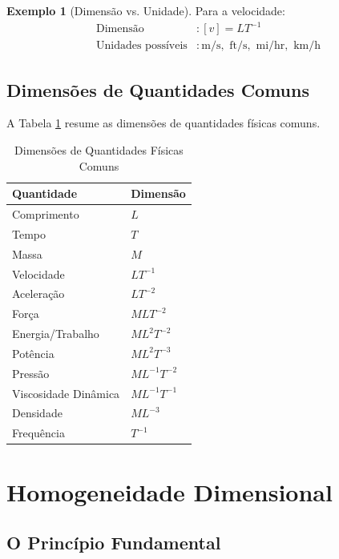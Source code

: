 \documentclass[12pt,a4paper,oneside]{book}
\theoremstyle{definition}
\newtheorem{example}[definition]{Exemplo}
\begin{document}
\begin{example}[Dimensão vs. Unidade]
Para a velocidade:
\begin{align}
    \text{Dimensão} &: [v] = LT^{-1} \\
    \text{Unidades possíveis} &: \text{m/s}, \text{ ft/s}, \text{ mi/hr}, \text{ km/h}
\end{align}
\end{example}

\subsection{Dimensões de Quantidades Comuns}

A Tabela \ref{tab:dimensions} resume as dimensões de quantidades físicas comuns.

\begin{table}[h]
\centering
\caption{Dimensões de Quantidades Físicas Comuns}
\label{tab:dimensions}
\begin{tabular}{ll}
\toprule
\textbf{Quantidade} & \textbf{Dimensão} \\
\midrule
Comprimento & $L$ \\
Tempo & $T$ \\
Massa & $M$ \\
Velocidade & $LT^{-1}$ \\
Aceleração & $LT^{-2}$ \\
Força & $MLT^{-2}$ \\
Energia/Trabalho & $ML^2T^{-2}$ \\
Potência & $ML^2T^{-3}$ \\
Pressão & $ML^{-1}T^{-2}$ \\
Viscosidade Dinâmica & $ML^{-1}T^{-1}$ \\
Densidade & $ML^{-3}$ \\
Frequência & $T^{-1}$ \\
\bottomrule
\end{tabular}
\end{table}

\section{Homogeneidade Dimensional}

\subsection{O Princípio Fundamental}
\end{document}
